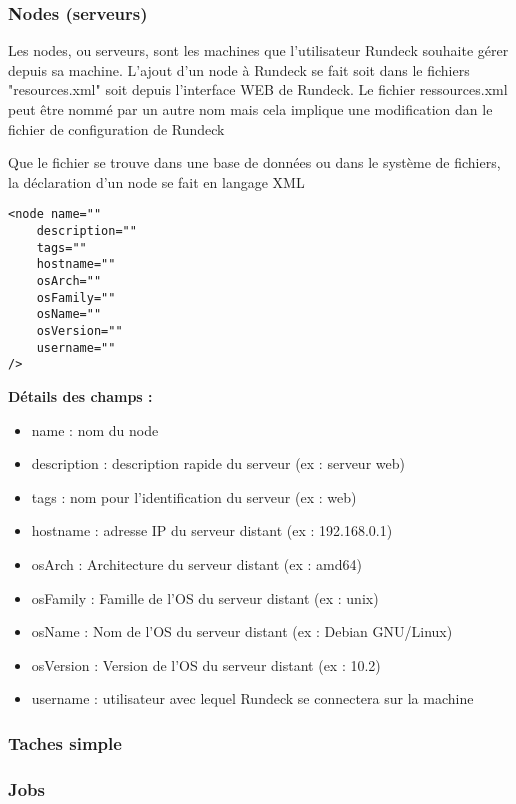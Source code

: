 \documentclass[12pt]{article}
\begin{document}
\subsubsection{Nodes (serveurs)}

Les nodes, ou serveurs, sont les machines que l'utilisateur Rundeck souhaite gérer depuis sa machine. L'ajout d'un node à Rundeck se fait soit dans le fichiers "resources.xml" soit depuis l'interface WEB de Rundeck.
Le fichier ressources.xml peut être nommé par un autre nom mais cela implique une modification dan le fichier de configuration de Rundeck

Que le fichier se trouve dans une base de données ou dans le système de fichiers, la déclaration d'un node se fait en langage XML

\begin{lstlisting}
<node name="" 
	description="" 
	tags="" 
	hostname="" 
	osArch="" 
	osFamily="" 
	osName="" 
	osVersion="" 
	username=""
/>
\end{lstlisting}

\vspace{0.5cm}

\textbf{Détails des champs :}

\begin{itemize}
    \item name : nom du node 
    \item description :  description rapide du serveur (ex : serveur web)
    \item tags : nom pour l'identification du serveur (ex : web)
    \item hostname : adresse IP du serveur distant (ex : 192.168.0.1)
    \item osArch : Architecture du serveur distant (ex : amd64)
    \item osFamily : Famille de l'OS du serveur distant (ex : unix)
    \item osName : Nom de l'OS du serveur distant (ex : Debian GNU/Linux)
    \item osVersion : Version de l'OS du serveur distant (ex : 10.2)
    \item username : utilisateur avec lequel Rundeck se connectera sur la machine
\end{itemize}

\subsubsection{Taches simple}

\subsubsection{Jobs}
\end{document}

